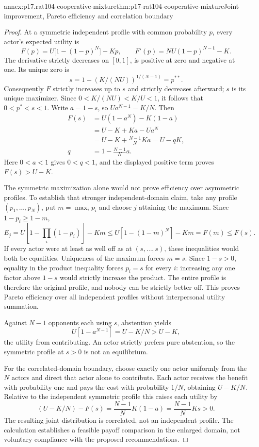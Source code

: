 \begin{annexitem}{annex:p17.rat104-cooperative-mixture}{thm:p17-rat104-cooperative-mixture}{Joint improvement, Pareto efficiency and correlation boundary}
\begin{proof}
At a symmetric independent profile with common probability \(p\), every
actor's expected utility is
\[
 F(p)=U\bigl[1-(1-p)^N\bigr]-Kp,
\qquad F'(p)=NU(1-p)^{N-1}-K.
\]
The derivative strictly decreases on \([0,1]\), is positive at zero
and negative at one. Its unique zero is
\[
                  s=1-(K/(NU))^{1/(N-1)}=p^{**}.
\]
Consequently \(F\) strictly increases up to \(s\) and strictly
decreases afterward; \(s\) is its unique maximizer. Since
\(0<K/(NU)<K/U<1\), it follows that \(0<p^*<s<1\).
Write \(a=1-s\), so \(U a^{N-1}=K/N\). Then
\[
\begin{aligned}
 F(s)&=U(1-a^N)-K(1-a)\\
     &=U-K+Ka-Ua^N\\
     &=U-K+\frac{N-1}{N}Ka=U-qK,\\
 q&=1-\frac{N-1}{N}a.
\end{aligned}
\]
Here \(0<a<1\) gives \(0<q<1\), and the displayed positive term
proves \(F(s)>U-K\).

The symmetric maximization alone would not prove efficiency over asymmetric
profiles. To establish that stronger independent-domain claim, take any
profile \((p_1,\ldots,p_N)\), put \(m=\max_i p_i\) and choose
\(j\) attaining the maximum. Since \(1-p_i\geq1-m\),
\[
 E_j=U\left[1-\prod_i(1-p_i)\right]-Km
       \leq U[1-(1-m)^N]-Km=F(m)\leq F(s).
\]
If every actor were at least as well off as at \((s,\ldots,s)\),
these inequalities would both be equalities. Uniqueness of the maximum
forces \(m=s\). Since \(1-s>0\), equality in the product inequality
forces \(p_i=s\) for every \(i\): increasing any one factor above
\(1-s\) would strictly increase the product. The entire profile is
therefore the original profile, and nobody can be strictly better off.
This proves Pareto efficiency over all independent profiles without
interpersonal utility summation.

Against \(N-1\) opponents each using \(s\), abstention yields
\[
        U[1-a^{N-1}]=U-K/N>U-K,
\]
the utility from contributing. An actor strictly prefers pure abstention,
so the symmetric profile at \(s>0\) is not an equilibrium.

For the correlated-domain boundary, choose exactly one actor uniformly
from the \(N\) actors and direct that actor alone to contribute.
Each actor receives the benefit with probability one and pays the cost
with probability \(1/N\), obtaining \(U-K/N\). Relative to the
independent symmetric profile this raises each utility by
\[
 (U-K/N)-F(s)=\frac{N-1}{N}K(1-a)
                          =\frac{N-1}{N}Ks>0.
\]
The resulting joint distribution is correlated, not an independent profile.
The calculation establishes a feasible payoff comparison in the enlarged
domain, not voluntary compliance with the proposed recommendations.
\end{proof}
\end{annexitem}

